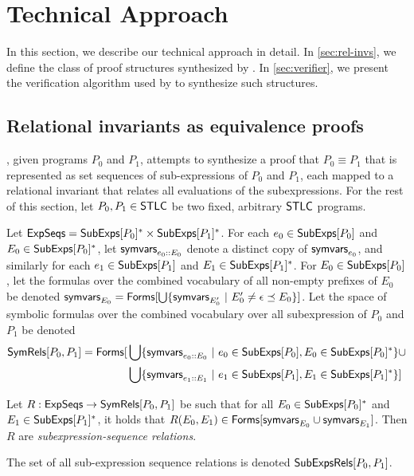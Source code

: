 \section{Technical Approach}
%
In this section, we describe our technical approach in detail.
%
In \autoref{sec:rel-invs}, we define the class of proof
structures synthesized by \sys.
%
In \autoref{sec:verifier}, we present the verification algorithm used
by \sys to synthesize such structures.

\subsection{Relational invariants as equivalence proofs}
\label{sec:rel-invs}
%
\sys, given programs $P_0$ and $P_1$, attempts to synthesize a proof
that $P_0 \equiv P_1$ that is represented as set sequences of
sub-expressions of $P_0$ and $P_1$, each mapped to a relational
invariant that relates all evaluations of the subexpressions.
%
For the rest of this section, let $P_0, P_1 \in \mathsf{STLC}$ be two fixed,
arbitrary $\mathsf{STLC}$ programs.

Let $\mathsf{ExpSeqs} = \mathsf{SubExps}[ P_0 ]^{*} \times \mathsf{SubExps}[ P_1 ]^{*}$.
%
For each $e_0 \in \mathsf{SubExps}[ P_0 ]$ and $E_0 \in \mathsf{SubExps}[ P_0 ]^{*}$, let
$\mathsf{symvars}_{e_0 \mathbin{::} E_0}$ denote a distinct copy of $\mathsf{symvars}_{e_0}$,
and similarly for each $e_1 \in \mathsf{SubExps}[ P_1 ]$ and $E_1 \in
\mathsf{SubExps}[ P_1 ]^{*}$.
%
For $E_0 \in \mathsf{SubExps}[  P_0  ]$, let the formulas over the combined
vocabulary of all non-empty prefixes of $E_0$ be denoted
$\symvars{E_0} = \formulas{ %
  \bigunion \setformer{ \symvars{E_0'} }{ E_0' \not= \epsilon \preceq
    E_0 } }$.
%
Let the space of symbolic formulas over the combined vocabulary over
all subexpression of $P_0$ and $P_1$ be denoted 
\begin{align*}
  \symrels{P_0}{P_1} =
  \formulas{ %
    & \bigunion \setformer{ \symvars{ e_0 \cons E_0 } }{ %
      e_0 \in \subexps{P_0}, E_0 \in \subexps{P_0}^{*} } \union \\ %
    & \bigunion \setformer{ \symvars{e_1 \cons E_1 } }{ %
      e_1 \in \subexps{P_1}, E_1 \in \subexps{P_1}^{*} } }  
\end{align*}
%
\begin{defn}
  \label{defn:sym-rels}
  Let $R: \mathsf{ExpSeqs} \to \mathsf{SymRels}[  P_0 ,  P_1  ]$ be such that %
  for all $E_0 \in \mathsf{SubExps}[ P_0 ]^{*}$ and $E_1 \in \mathsf{SubExps}[ P_1 ]^{*}$,
  it holds that %
  $R(E_0, E_1) \in \mathsf{Forms}[  \mathsf{symvars}_{E_0} \cup \mathsf{symvars}_{ E_1 }  ]$.
  Then $R$ are \emph{subexpression-sequence relations}.
\end{defn}
%
The set of all sub-expression sequence relations is denoted
$\mathsf{SubExpsRels}[ P_0, P_1 ]$.

